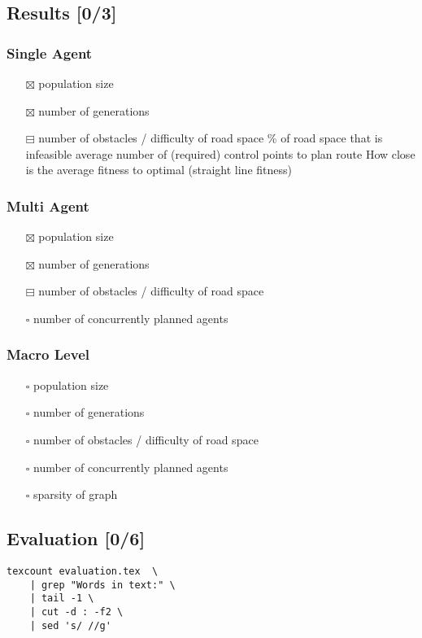 \documentclass[11pt]{article}
\begin{document}
\subsection{{\bfseries\sffamily [ ]} Results [0/3]}
\label{sec:org6c2cbfb}
\subsubsection{{\bfseries\sffamily [ ]} Single Agent}
\label{sec:orgfdaa7f7}
\begin{itemize}
\item[{$\boxtimes$}] population size
\item[{$\boxtimes$}] number of generations
\item[{$\boxminus$}] number of obstacles / difficulty of road space
\% of road space that is infeasible
average number of (required) control points to plan route
How close is the average fitness to optimal (straight line fitness)
\end{itemize}
\subsubsection{{\bfseries\sffamily [ ]} Multi Agent}
\label{sec:org82e8378}
\begin{itemize}
\item[{$\boxtimes$}] population size
\item[{$\boxtimes$}] number of generations
\item[{$\boxminus$}] number of obstacles / difficulty of road space
\item[{$\square$}] number of concurrently planned agents
\end{itemize}
\subsubsection{{\bfseries\sffamily [ ]} Macro Level}
\label{sec:org963040a}
\begin{itemize}
\item[{$\square$}] population size
\item[{$\square$}] number of generations
\item[{$\square$}] number of obstacles / difficulty of road space
\item[{$\square$}] number of concurrently planned agents
\item[{$\square$}] sparsity of graph
\end{itemize}

\subsection{{\bfseries\sffamily [ ]} Evaluation [0/6]}
\label{sec:org6a2f35e}
\begin{verbatim}
texcount evaluation.tex  \
    | grep "Words in text:" \
    | tail -1 \
    | cut -d : -f2 \
    | sed 's/ //g'
\end{verbatim}
\end{document}
